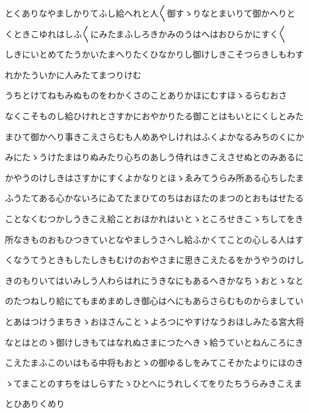 \documentclass[a4paper,11pt,landscape]{ltjtarticle}
\begin{document}
\par\medskip
とくありなやましかりてふし給へれと人〱御すゝりなとまいりて御かへりと
\par\medskip
くときこゆれはしふ〱にみたまふしろきかみのうはへはおひらかにすく〱
\par\medskip
しきにいとめてたうかいたまへりたくひなかりし御けしきこそつらきしもわす
\par\medskip
れかたういかに人みたてまつりけむ
\par\medskip
うちとけてねもみぬものをわかくさのことありかほにむすほゝるらむおさ
\par\medskip
なくこそものし給ひけれとさすかにおやかりたる御ことはもいとにくしとみた
\par\medskip
まひて御かへり事きこえさらむも人めあやしけれはふくよかなるみちのくにか
\par\medskip
みにたゝうけたまはりぬみたり心ちのあしう侍れはきこえさせぬとのみあるに
\par\medskip
かやうのけしきはさすかにすくよかなりとほゝゑみてうらみ所ある心ちしたま
\par\medskip
ふうたてある心かないろにゐてたまひてのちはおほたのまつのとおもはせたる
\par\medskip
ことなくむつかしうきこえ給ことおほかれはいとゝところせきこゝちしてをき
\par\medskip
所なきものおもひつきていとなやましうさへし給ふかくてことの心しる人はす
\par\medskip
くなうてうときもしたしきもむけのおやさまに思きこえたるをかうやうのけし
\par\medskip
きのもりいてはいみしう人わらはれにうきなにもあるへきかなちゝおとゝなと
\par\medskip
のたつねしり給にてもまめまめしき御心はへにもあらさらむものからましてい
\par\medskip
とあはつけうまちきゝおほさんことゝよろつにやすけなうおほしみたる宮大将
\par\medskip
なとはとのゝ御けしきもてはなれぬさまにつたへきゝ給うていとねんころにき
\par\medskip
こえたまふこのいはもる中将もおとゝの御ゆるしをみてこそかたよりにほのき
\par\medskip
ゝてまことのすちをはしらすたゝひとへにうれしくてをりたちうらみきこえま
\par\medskip
とひありくめり
\par\medskip
\end{document}
